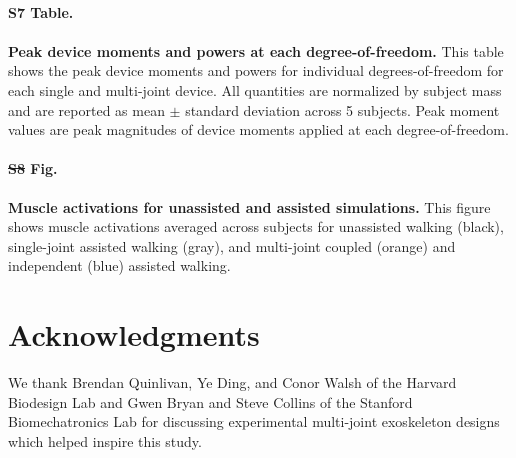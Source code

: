 \documentclass[10pt,letterpaper]{article}
\providecommand{\DIFaddtex}[1]{{\protect\color{blue}{#1}}} %
\providecommand{\DIFdeltex}[1]{{\protect\color{red}\sout{#1}}}                      %
\providecommand{\DIFaddbegin}{} %
\providecommand{\DIFaddend}{} %
\providecommand{\DIFdelbegin}{} %
\providecommand{\DIFdelend}{} %
\providecommand{\DIFadd}[1]{\texorpdfstring{\DIFaddtex{#1}}{#1}} %
\providecommand{\DIFdel}[1]{\texorpdfstring{\DIFdeltex{#1}}{}} %
\newcommand{\DIFscaledelfig}{0.5}
\newlength{\DIFdelgraphicswidth} %
\newlength{\DIFdelgraphicsheight} %
\newcommand{\DIFaddincludegraphics}[2][]{{\color{blue}\fbox{\DIFOincludegraphics[#1]{#2}}}} %
\newcommand{\DIFdelincludegraphics}[2][]{%
\sbox{\DIFdelgraphicsbox}{\DIFOincludegraphics[#1]{#2}}%
\settoboxwidth{\DIFdelgraphicswidth}{\DIFdelgraphicsbox} %
\settoboxtotalheight{\DIFdelgraphicsheight}{\DIFdelgraphicsbox} %
\scalebox{\DIFscaledelfig}{%
\parbox[b]{\DIFdelgraphicswidth}{\usebox{\DIFdelgraphicsbox}\\[-\baselineskip] \rule{\DIFdelgraphicswidth}{0em}}\llap{\resizebox{\DIFdelgraphicswidth}{\DIFdelgraphicsheight}{%
\setlength{\unitlength}{\DIFdelgraphicswidth}%
\begin{picture}(1,1)%
\thicklines\linethickness{2pt} %
{\color[rgb]{1,0,0}\put(0,0){\framebox(1,1){}}}%
{\color[rgb]{1,0,0}\put(0,0){\line( 1,1){1}}}%
{\color[rgb]{1,0,0}\put(0,1){\line(1,-1){1}}}%
\end{picture}%
}*{3pt}}} %
} %
\DeclareRobustCommand{\DIFaddbegin}{\DIFOaddbegin \let\includegraphics\DIFaddincludegraphics} %
\DeclareRobustCommand{\DIFaddend}{\DIFOaddend \let\includegraphics\DIFOincludegraphics} %
\DeclareRobustCommand{\DIFdelbegin}{\DIFOdelbegin \let\includegraphics\DIFdelincludegraphics} %
\DeclareRobustCommand{\DIFdelend}{\DIFOaddend \let\includegraphics\DIFOincludegraphics} %
\begin{document}
\paragraph*{S7 Table.}
\label{S7_Table}
{\bf \DIFaddbegin \DIFadd{Subject-specific relative metabolic reductions.}} \DIFadd{This table shows subject-specific relative reductions in gross average total metabolic rate for each single and multi-joint device. All quantities are percent reductions in metabolic cost relative to unassisted walking. 
}

\paragraph*{\DIFadd{S8 Table.}}
\label{S8_Table}
{\bf \DIFaddend Peak device moments and powers at each degree-of-freedom.} This table shows the peak device moments and powers for individual degrees-of-freedom for each single and multi-joint device. All quantities are normalized by subject mass and are reported as mean $\pm$ standard deviation across 5 subjects. Peak moment values are peak magnitudes of device moments applied at each degree-of-freedom.

\paragraph*{\DIFdelbegin \DIFdel{S8 }\DIFdelend \DIFaddbegin \DIFadd{S9 }\DIFaddend Fig.}
\DIFdelbegin %
\DIFdelend \DIFaddbegin \label{S9_Fig}
\DIFaddend {\bf Muscle activations for unassisted and assisted simulations.} This figure shows muscle activations averaged across subjects for unassisted walking (black), single-joint assisted walking (gray), and multi-joint coupled (orange) and independent (blue) assisted walking.

\section*{Acknowledgments}
We thank Brendan Quinlivan, Ye Ding, and Conor Walsh of the Harvard Biodesign Lab and Gwen Bryan and Steve Collins of the Stanford Biomechatronics Lab for discussing experimental multi-joint exoskeleton designs which helped inspire this study. 

\nolinenumbers
\end{document}
